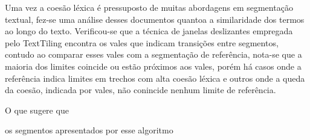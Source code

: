 Uma vez a coesão léxica é pressuposto de muitas abordagens em segmentação textual, fez-se uma análise desses documentos quantoa a similaridade dos termos ao longo do texto. Verificou-se que a técnica de janelas deslizantes empregada pelo TextTiling encontra os vales que indicam transições entre segmentos, contudo ao comparar esses vales com a segmentação de referência, nota-se que a maioria dos limites coincide  ou estão próximos aos vales, porém há casos onde a referência indica limites em trechos com alta coesão léxica e outros onde a queda da coesão, indicada por vales, não conincide nenhum limite de referência. 

O que sugere que  

os segmentos apresentados por esse algoritmo 